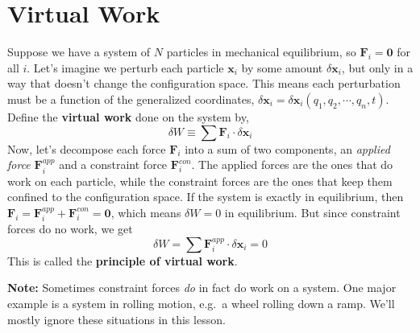 \documentclass[
  letterpaper,
  DIV=11,
  numbers=noendperiod]{scrreprt}
\begin{document}
\hypertarget{virtual-work}{%
\section{Virtual Work}\label{virtual-work}}

Suppose we have a system of \(N\) particles in mechanical equilibrium,
so \(\mathbf{F}_i=\mathbf{0}\) for all \(i\). Let's imagine we perturb
each particle \(\mathbf{x}_i\) by some amount \(\delta \mathbf{x}_i\),
but only in a way that doesn't change the configuration space. This
means each perturbation must be a function of the generalized
coordinates,
\(\delta \mathbf{x}_i = \delta \mathbf{x}_i(q_1, q_2, \cdots, q_n, t)\).
Define the \textbf{virtual work} done on the system by, \[
\delta W \equiv \sum \mathbf{F}_i \cdot \delta\mathbf{x}_i
\] Now, let's decompose each force \(\mathbf{F}_i\) into a sum of two
components, an \emph{applied force} \(\mathbf{F}_i^{app}\) and a
constraint force \(\mathbf{F}_i^{con}\). The applied forces are the ones
that do work on each particle, while the constraint forces are the ones
that keep them confined to the configuration space. If the system is
exactly in equilibrium, then
\(\mathbf{F}_i = \mathbf{F}_i^{app} + \mathbf{F}_i^{con} = \mathbf{0}\),
which means \(\delta W = 0\) in equilibrium. But since constraint forces
do no work, we get \[
\delta W = \sum \mathbf{F}_i^{app} \cdot \delta\mathbf{x}_i = 0
\] This is called the \textbf{principle of virtual work}.

\textbf{Note:} Sometimes constraint forces \emph{do} in fact do work on
a system. One major example is a system in rolling motion, e.g.~a wheel
rolling down a ramp. We'll mostly ignore these situations in this
lesson.
\end{document}

